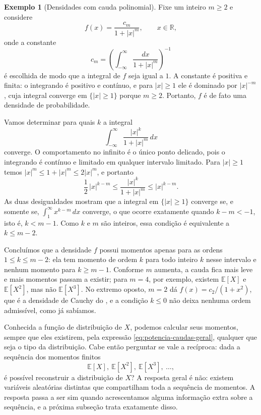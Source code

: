 \documentclass[12pt,portuguese]{article}
\theoremstyle{definition}
\newtheorem{example}[example]{Exemplo}
\theoremstyle{plainexercise}
\theoremstyle{starredexercise}
\theoremstyle{definition}
\begin{document}
\begin{example}[Densidades com cauda polinomial]\label{ex:momento-cauda-polinomial}
Fixe um inteiro $m\geqslant 2$ e considere
\[
f(x)=\frac{c_m}{1+|x|^m},\qquad x\in\mathbb{R},
\]
onde a constante
\[
c_m=\left(\int_{-\infty}^{\infty}\frac{dx}{1+|x|^m}\right)^{-1}
\]
é escolhida de modo que a integral de $f$ seja igual a $1$. A constante é positiva e finita: o
integrando é positivo e contínuo, e para $|x|\geqslant 1$ ele é dominado por
$|x|^{-m}$, cuja integral converge em $\{|x|\geqslant 1\}$ porque
$m\geqslant 2$. Portanto, $f$ é de fato uma densidade de probabilidade.

Vamos determinar para quais $k$ a integral
\[
\int_{-\infty}^{\infty}\frac{|x|^k}{1+|x|^m}\,dx
\]
converge. O comportamento no infinito é o único ponto delicado, pois o
integrando é contínuo e limitado em qualquer intervalo limitado. Para
$|x|\geqslant 1$ temos $|x|^m\leqslant 1+|x|^m\leqslant 2|x|^m$, e portanto
\[
\frac{1}{2}\,|x|^{k-m}\leqslant\frac{|x|^k}{1+|x|^m}\leqslant|x|^{k-m}.
\]
As duas desigualdades mostram que a integral em $\{|x|\geqslant 1\}$ converge
se, e somente se, $\int_1^{\infty}x^{k-m}\,dx$ converge, o que ocorre
exatamente quando $k-m<-1$, isto é, $k<m-1$. Como $k$ e $m$ são inteiros,
essa condição é equivalente a $k\leqslant m-2$.

Concluímos que a densidade $f$ possui momentos apenas para as ordens
$1\leqslant k\leqslant m-2$: ela tem momento de ordem $k$ para todo inteiro
$k$ nesse intervalo e nenhum momento para $k\geqslant m-1$. Conforme $m$
aumenta, a cauda fica mais leve e mais momentos passam a existir; para
$m=4$, por exemplo, existem $\mathbb{E}[X]$ e $\mathbb{E}[X^2]$, mas não
$\mathbb{E}[X^3]$. No extremo oposto, $m=2$ dá $f(x)=c_2/(1+x^2)$, que é a
densidade de Cauchy do , e a condição
$k\leqslant 0$ não deixa nenhuma ordem admissível, como já sabíamos.
\end{example}

Conhecida a função de distribuição de $X$, podemos calcular seus momentos,
sempre que eles existirem, pela expressão \eqref{eq:potencia-caudas-geral},
qualquer que seja o tipo da distribuição.
Cabe então perguntar se vale a recíproca: dada a sequência dos momentos finitos
\[
\mathbb{E}[X],\ \mathbb{E}[X^2],\ \mathbb{E}[X^3],\ \ldots,
\]
é possível reconstruir a distribuição de $X$? A resposta geral é não: existem
variáveis aleatórias distintas que compartilham toda a sequência de momentos.
A resposta passa a ser sim quando acrescentamos alguma informação extra sobre a
sequência, e a próxima subseção trata exatamente disso.
\end{document}
